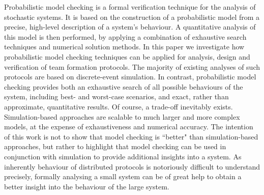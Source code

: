 \documentclass{llncs}
\newcommand{\comment}[1]{{\color{red}{[\sf #1]}}}
\begin{document}
Probabilistic model checking is a formal verification technique
for the analysis of stochastic systems. It is based
on the construction of a probabilistic model from a precise,
high-level description of a system's behaviour. A quantitative
analysis of this model is then performed, by applying a
combination of exhaustive search techniques and numerical
solution methods. In this paper we investigate how probabilistic model checking techniques can be applied for analysis, design and verification of team formation protocols. The majority of existing analyses of such protocols are based on discrete-event simulation. In contrast, probabilistic model checking provides both an exhaustive search of all possible behaviours of the system, including best- and worst-case scenarios, and exact, rather than approximate, quantitative results. Of course, a trade-off inevitably exists. Simulation-based approaches are scalable to much larger and more complex models, at the expense of exhaustiveness and numerical accuracy. The intention of this work is not to show that model checking is ``better" than simulation-based approaches, but rather to highlight that model checking can be used in conjunction with simulation to provide additional insights into a system. As inherently behaviour of distributed protocols is notoriously difficult to understand precisely, formally analysing a small system can be of great help to obtain a better insight into the behaviour of the large system.

\comment{TL: the above paragraph is toooooooooooooooooooooooooooooooooooo long?}
\end{document}
